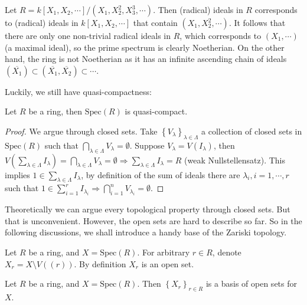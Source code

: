 \documentclass{note-eng}
\begin{document}
\begin{example}
    Let $R = k[X_1, X_2, \cdots] / (X_1, X_2^2, X_3^3, \cdots)$. Then (radical) ideals in $R$ corresponds to (radical) ideals in $k[X_1, X_2, \cdots]$ that contain $(X_1, X_2^2, \cdots)$. It follows that there are only one non-trivial radical ideals in $R$, which corresponds to $(X_1, \cdots)$ (a maximal ideal), so the prime spectrum is clearly Noetherian. On the other hand, the ring is not Noetherian as it has an infinite ascending chain of ideals $(\overline{X_1}) \subset (\overline{X_1}, \overline{X_2}) \subset \cdots$.
\end{example}

Luckily, we still have quasi-compactness:

\begin{proposition}\label{prop:spectrum-compact}
    Let $R$ be a ring, then $\mathrm{Spec}(R)$ is quasi-compact.
\end{proposition}

\begin{proof}
    We argue through closed sets. Take $\left\lbrace V_\lambda \right\rbrace_{\lambda \in \Lambda}$ a collection of closed sets in $\mathrm{Spec}(R)$ such that $\bigcap\limits_{\lambda \in \Lambda} V_\lambda = \emptyset$. Suppose $V_\lambda = V(I_\lambda)$, then $V(\sum\limits_{\lambda \in \Lambda} I_\lambda) = \bigcap\limits_{\lambda \in \Lambda} V_\lambda = \emptyset \Rightarrow \sum\limits_{\lambda \in \Lambda}I_\lambda = R$ (weak Nullstellensatz). This implies $1 \in \sum\limits_{\lambda \in \Lambda}I_\lambda$, by definition of the sum of ideals there are $\lambda_i, i = 1, \cdots, r$ such that $1 \in \sum\limits_{i = 1}^{r} I_{\lambda_i} \Rightarrow \bigcap\limits_{i = 1}^{n} V_{\lambda_i} = \emptyset$.
\end{proof}

Theoretically we can argue every topological property through closed sets. But that is unconvenient. However, the open sets are hard to describe so far. So in the following discussions, we shall introduce a handy base of the Zariski topology.

\begin{notation}
    Let $R$ be a ring, and $X = \mathrm{Spec}(R)$. For arbitrary $r \in R$, denote $X_r = X \setminus V((r))$. By definition $X_r$ is an open set.
\end{notation}

\begin{proposition}
    Let $R$ be a ring, and $X = \mathrm{Spec}(R)$. Then $\left\lbrace X_r \right\rbrace_{r \in R}$ is a basis of open sets for $X$.
\end{proposition}
\end{document}
